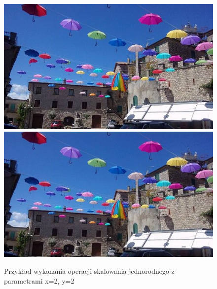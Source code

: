 \documentclass{article}
\begin{document}
\begin{figure}[!ht]
	\includegraphics[scale=0.7]{img/rgb-obraz1}	
	\includegraphics[scale=0.7]{img/geometryczne/skalowanie_jednorodne-rgb}
	\caption{Przykład wykonania operacji skalowania jednorodnego z parametrami x=2, y=2}
	\label{fig11}	
	\end{figure}
	
\end{document}
